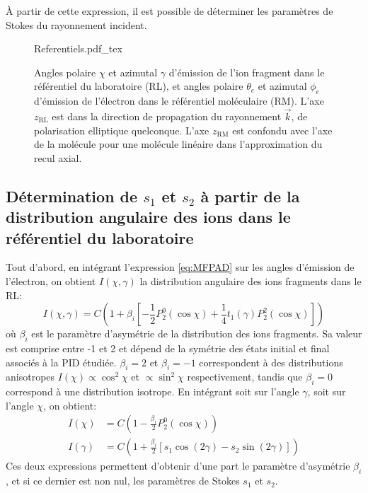 \`{A} partir de cette expression, il est possible de déterminer les paramètres de Stokes du rayonnement incident.

\begin{figure}
\centering
\def\svgwidth{0.5\textwidth}
{Referentiels.pdf_tex}
\caption{Angles polaire $\chi$ et azimutal $\gamma$ d'émission de l'ion fragment dans le référentiel du laboratoire (RL), et angles polaire $\theta_e$ et azimutal $\phi_e$ d'émission de l'électron dans le référentiel moléculaire (RM). L'axe $z_{\text{RL}}$ est dans la direction de propagation du rayonnement $\vec{k}$, de polarisation elliptique quelconque. L'axe $z_{\text{RM}}$ est confondu avec l'axe de la molécule pour une molécule linéaire dans l'approximation du recul axial.}
\label{fig:Referentiels}
\end{figure}

\subsection{Détermination de $s_1$ et $s_2$ à partir de la distribution angulaire des ions dans le référentiel du laboratoire}
Tout d'abord, en intégrant l'expression \ref{eq:MFPAD} sur les angles d'émission de l'électron, on obtient $I(\chi, \gamma)$ la distribution angulaire des ions fragments dans le RL:
\begin{equation}
I(\chi, \gamma) = C \left( 1 + \beta_i \left[ - \frac{1}{2} P_2^0(\cos \chi) + \frac{1}{4} t_1(\gamma) P_2^2(\cos \chi) \right] \right)
\end{equation}
où $\beta_i$ est le paramètre d'asymétrie de la distribution des ions fragments. Sa valeur est comprise entre -1 et 2 et dépend de la symétrie des états initial et final associés à la PID étudiée. $\beta_i =2$ et $\beta_i = -1$ correspondent à des distributions anisotropes $I(\chi) \propto \cos^2 \chi$ et $\propto \sin^2 \chi$ respectivement, tandis que $\beta_i = 0$ correspond à une distribution isotrope. En intégrant soit sur l'angle $\gamma$, soit sur l'angle $\chi$, on obtient:
\begin{align}
I(\chi) & = C \left( 1 - \frac{\beta_i}{2} P_2^0(\cos \chi) \right) \\
I(\gamma) & = C \left( 1 + \frac{\beta_i}{2} \left[ s_1 \cos (2\gamma) - s_2 \sin (2\gamma) \right] \right)
\end{align}
Ces deux expressions permettent d'obtenir d'une part le paramètre d'asymétrie $\beta_i$, et si ce dernier est non nul, les paramètres de Stokes $s_1$ et $s_2$.

